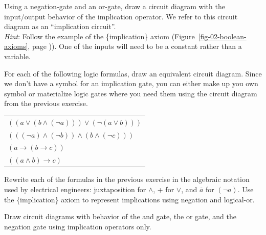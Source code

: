 \begin{ExerciseList}
\Exercise Using a negation-gate and an or-gate, draw a circuit diagram with the input/output behavior of the implication operator.
We refer to this circuit diagram as an ``implication circuit''.\\
\emph{Hint}: Follow the example of the \{implication\} axiom
(Figure~\ref{fig-02-boolean-axioms}, page \pageref{fig-02-boolean-axioms})).
One of the inputs will need to be a constant rather than a variable.

\Exercise For each of the following logic formulas, draw an equivalent circuit diagram.
Since we don't have a symbol for an implication gate,
you can either make up you own symbol or
materialize logic gates where you need them
using the circuit diagram from the previous exercise.
\begin{center}
\begin{tabular}{l}
$((a \vee (b \wedge (\neg a))) \vee (\neg (a \vee b)))$ \\
$(((\neg a) \wedge (\neg b)) \wedge (b \wedge (\neg c)))$ \\
$(a \rightarrow (b \rightarrow c))$ \\
$((a \wedge b) \rightarrow c)$ \\
\end{tabular}
\end{center}

\Exercise Rewrite each of the formulas in the previous exercise
in the algebraic notation used by electrical engineers:
juxtaposition for $\wedge$, + for $\vee$, and $\overline{a}$ for $(\neg a)$.
Use the \{implication\} axiom to represent
implications using negation and logical-or.

\Exercise Draw circuit diagrams with behavior
of the and gate, the or gate, and the negation gate
using implication operators only.
\end{ExerciseList}


